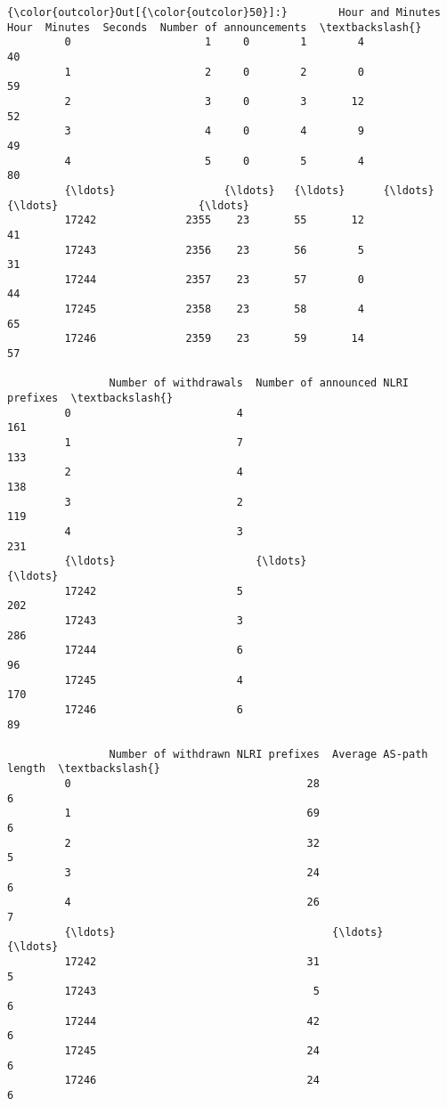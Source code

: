 \documentclass[11pt]{article}
\begin{document}
\begin{Verbatim}[commandchars=\\\{\}]
{\color{outcolor}Out[{\color{outcolor}50}]:}        Hour and Minutes  Hour  Minutes  Seconds  Number of announcements  \textbackslash{}
         0                     1     0        1        4                       40   
         1                     2     0        2        0                       59   
         2                     3     0        3       12                       52   
         3                     4     0        4        9                       49   
         4                     5     0        5        4                       80   
         {\ldots}                 {\ldots}   {\ldots}      {\ldots}      {\ldots}                      {\ldots}   
         17242              2355    23       55       12                       41   
         17243              2356    23       56        5                       31   
         17244              2357    23       57        0                       44   
         17245              2358    23       58        4                       65   
         17246              2359    23       59       14                       57   
         
                Number of withdrawals  Number of announced NLRI prefixes  \textbackslash{}
         0                          4                                161   
         1                          7                                133   
         2                          4                                138   
         3                          2                                119   
         4                          3                                231   
         {\ldots}                      {\ldots}                                {\ldots}   
         17242                      5                                202   
         17243                      3                                286   
         17244                      6                                 96   
         17245                      4                                170   
         17246                      6                                 89   
         
                Number of withdrawn NLRI prefixes  Average AS-path length  \textbackslash{}
         0                                     28                       6   
         1                                     69                       6   
         2                                     32                       5   
         3                                     24                       6   
         4                                     26                       7   
         {\ldots}                                  {\ldots}                     {\ldots}   
         17242                                 31                       5   
         17243                                  5                       6   
         17244                                 42                       6   
         17245                                 24                       6   
         17246                                 24                       6   
         

\end{Verbatim}
\end{document}
